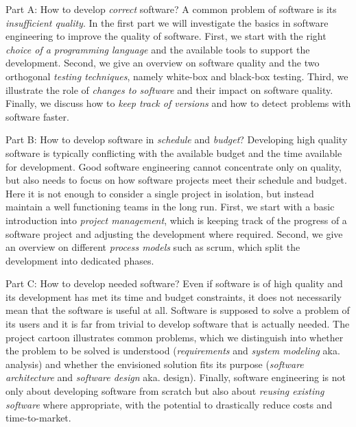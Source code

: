 \begin{frame}{\myframetitle{}}
	\small
	\begin{fancycolumns}[columns=3,t,widths={30,34,37}]
		\begin{definition}{Part A: How to develop \emph{correct} software?}
			A common problem of software is its \emph{insufficient quality}. In the first part we will investigate the basics in software engineering to improve the quality of software. First, we start with the right \emph{choice of a programming language} and the available tools to support the development. Second, we give an overview on software quality and the two orthogonal \emph{testing techniques}, namely white-box and black-box testing. Third, we illustrate the role of \emph{changes to software} and their impact on software quality. Finally, we discuss how to \emph{keep track of versions} and how to detect problems with software faster.
		\end{definition}
	\nextcolumn
		\begin{definition}{Part B: How to develop software in \emph{schedule} and \emph{budget}?}
			Developing high quality software is typically conflicting with the available budget and the time available for development. Good software engineering cannot concentrate only on quality, but also needs to focus on how software projects meet their schedule and budget. Here it is not enough to consider a single project in isolation, but instead maintain a well functioning teams in the long run. First, we start with a basic introduction into \emph{project management}, which is keeping track of the progress of a software project and adjusting the development where required. Second, we give an overview on different \emph{process models} such as scrum, which split the development into dedicated phases.
		\end{definition}
	\nextcolumn
		\begin{definition}{Part C: How to develop needed software?}
			Even if software is of high quality and its development has met its time and budget constraints, it does not necessarily mean that the software is useful at all. Software is supposed to solve a problem of its users and it is far from trivial to develop software that is actually needed. The project cartoon illustrates common problems, which we distinguish into whether the problem to be solved is understood (\emph{requirements} and \emph{system modeling} aka. analysis) and whether the envisioned solution fits its purpose (\emph{software architecture} and \emph{software design} aka. design). Finally, software engineering is not only about developing software from scratch but also about \emph{reusing existing software} where appropriate, with the potential to drastically reduce costs and time-to-market.
		\end{definition}
	\end{fancycolumns}
\end{frame}

